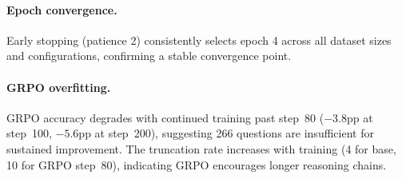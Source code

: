 \paragraph{Epoch convergence.} Early stopping (patience 2) consistently selects epoch 4 across all dataset sizes and configurations, confirming a stable convergence point.

\paragraph{GRPO overfitting.} GRPO accuracy degrades with continued training past step~80 ($-3.8$pp at step~100, $-5.6$pp at step~200), suggesting 266 questions are insufficient for sustained improvement. The truncation rate increases with training (4 for base, 10 for GRPO step~80), indicating GRPO encourages longer reasoning chains.
